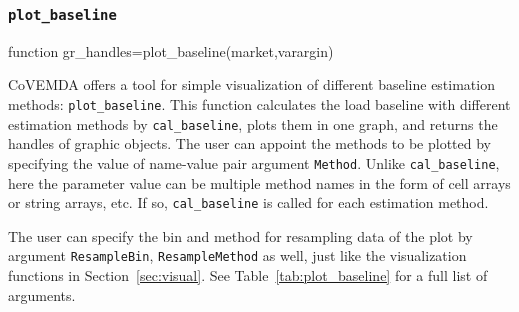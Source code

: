 \documentclass[10pt]{article}
\newcommand{\covemda}{CoVEMDA}
\numberwithin{equation}{section}
\numberwithin{table}{section}
\numberwithin{figure}{section}
\begin{document}
\subsubsection{\texttt{plot\_baseline}}\label{func:plot_baseline}

\begin{Code}
function gr_handles=plot_baseline(market,varargin)
\end{Code}

\covemda{} offers a tool for simple visualization of different baseline estimation methods: \verb!plot_baseline!. This function calculates the load baseline with different estimation methods by \verb!cal_baseline!, plots them in one graph, and returns the handles of graphic objects. The user can appoint the methods to be plotted by specifying the value of name-value pair argument \verb!Method!. Unlike \verb!cal_baseline!, here the parameter value can be multiple method names in the form of cell arrays or string arrays, etc. If so, \verb!cal_baseline! is called for each estimation method.

The user can specify the bin and method for resampling data of the plot by argument \verb!ResampleBin!, \verb!ResampleMethod! as well, just like the visualization functions in Section~\ref{sec:visual}. See Table~\ref{tab:plot_baseline} for a full list of arguments.
\end{document}

